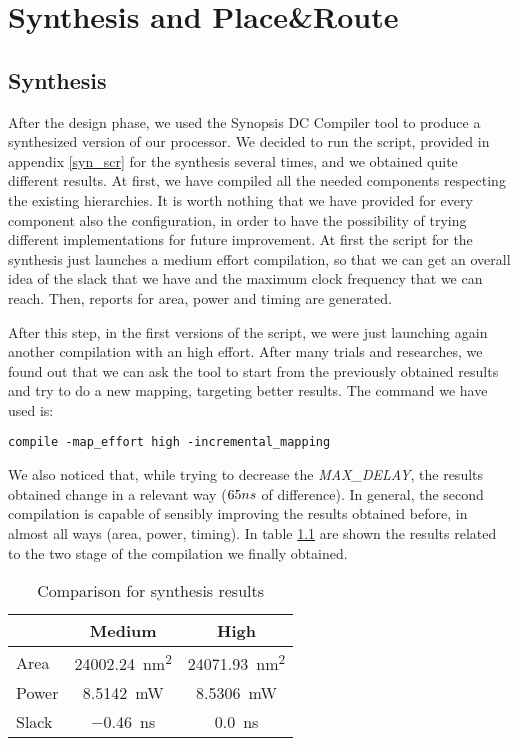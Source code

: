 \chapter{Synthesis and Place\&Route}
\label{chap_synth}

\section{Synthesis}
After the design phase, we used the Synopsis DC Compiler tool to produce a synthesized version of our \dlx processor. We decided to run the script, provided in appendix \ref{syn_scr} for the synthesis several times, and we obtained quite different results.
At first, we have compiled all the needed components respecting the existing hierarchies. It is worth nothing that we have provided for every component also the configuration, in order to have the possibility of trying different implementations for future improvement. At first the script for the synthesis just launches a medium effort compilation, so that we can get an overall idea of the slack that we have and the maximum clock frequency that we can reach. 
Then, reports for area, power and timing are generated.

After this step, in the first versions of the script, we were just launching again another compilation with an high effort. After many trials and researches, we found out that we can ask the tool to start from the previously obtained results and try to do a new mapping, targeting better results. The command we have used is:
\begin{lstlisting}[style=B]
	compile -map_effort high -incremental_mapping
\end{lstlisting}

We also noticed that, while trying to decrease the \textit{MAX\_DELAY}, the results obtained change in a relevant way ($65 \space ns$ of difference). In general, the second compilation is capable of sensibly improving the results obtained before, in almost all ways (area, power, timing). In table \ref{tab_rep} are shown the results related to the two stage of the compilation we finally obtained.

\begin{table}[]
	\centering
	\begin{tabular}{l|cc}
		\toprule
				& Medium  					& High  								\\
		\midrule
		Area	& \SI{24002.24}{\nano\meter^2}	&  	\SI{24071.93}{\nano\meter^2}			\\
		Power	& \SI{8.5142}{\milli\watt}		&  	\SI{8.5306}{\milli\watt}			\\
		Slack	& \SI{-0.46}{\nano\second}		&	\SI{0.0}{\nano\second}				\\ 
		\bottomrule
	\end{tabular}
\caption{Comparison for synthesis results}
\label{tab_rep}
\end{table}
